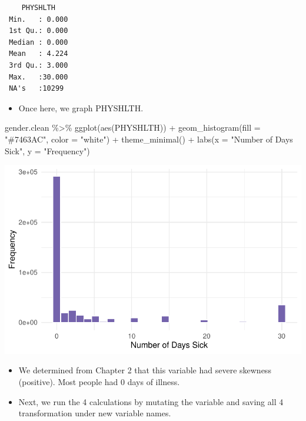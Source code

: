 \documentclass[
  letterpaper,
  DIV=11,
  numbers=noendperiod]{scrreprt}
\newenvironment{Shaded}{\begin{snugshade}}{\end{snugshade}}
\newcommand{\AttributeTok}[1]{\textcolor[rgb]{0.40,0.45,0.13}{#1}}
\newcommand{\FunctionTok}[1]{\textcolor[rgb]{0.28,0.35,0.67}{#1}}
\newcommand{\NormalTok}[1]{\textcolor[rgb]{0.00,0.23,0.31}{#1}}
\newcommand{\SpecialCharTok}[1]{\textcolor[rgb]{0.37,0.37,0.37}{#1}}
\newcommand{\StringTok}[1]{\textcolor[rgb]{0.13,0.47,0.30}{#1}}
\providecommand{\tightlist}{%
  \setlength{\itemsep}{0pt}\setlength{\parskip}{0pt}}\usepackage{longtable,booktabs,array}
\begin{document}
\begin{verbatim}
    PHYSHLTH     
 Min.   : 0.000  
 1st Qu.: 0.000  
 Median : 0.000  
 Mean   : 4.224  
 3rd Qu.: 3.000  
 Max.   :30.000  
 NA's   :10299   
\end{verbatim}

\begin{itemize}
\tightlist
\item
  Once here, we graph PHYSHLTH.
\end{itemize}

\begin{Shaded}
\begin{Highlighting}[]
\NormalTok{gender.clean }\SpecialCharTok{\%\textgreater{}\%}
    \FunctionTok{ggplot}\NormalTok{(}\FunctionTok{aes}\NormalTok{(PHYSHLTH)) }\SpecialCharTok{+} \FunctionTok{geom\_histogram}\NormalTok{(}\AttributeTok{fill =} \StringTok{"\#7463AC"}\NormalTok{, }\AttributeTok{color =} \StringTok{"white"}\NormalTok{) }\SpecialCharTok{+}
    \FunctionTok{theme\_minimal}\NormalTok{() }\SpecialCharTok{+} \FunctionTok{labs}\NormalTok{(}\AttributeTok{x =} \StringTok{"Number of Days Sick"}\NormalTok{, }\AttributeTok{y =} \StringTok{"Frequency"}\NormalTok{)}
\end{Highlighting}
\end{Shaded}

\includegraphics{probability_files/figure-pdf/unnamed-chunk-67-1.pdf}

\begin{itemize}
\item
  We determined from Chapter 2 that this variable had severe skewness
  (positive). Most people had 0 days of illness.
\item
  Next, we run the 4 calculations by mutating the variable and saving
  all 4 transformation under new variable names.
\end{itemize}
\end{document}
